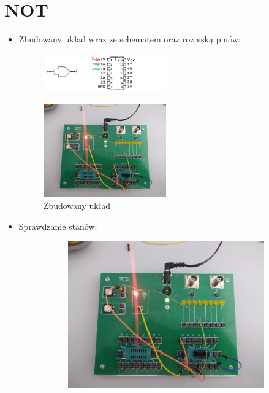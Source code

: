     \section{NOT}
        \begin{itemize}
            \item Zbudowany układ wraz ze schematem oraz rozpiską pinów:
                \begin{figure}[H]
                    \centering
                    \includegraphics[width=0.5\textwidth]{img/schemes_with_pins/NOR_not_w_pins.png}
                    \label{NOR:schemat_not_w_pins}
                \end{figure}
                \begin{figure}[H]
                    \centering
                    \includegraphics[width=0.5\textwidth]{img/NOR/funkcje/1652306732483_scaled.png}
                    \caption{Zbudowany układ}
                    \label{NOR:zbudowany_układ_NOT}
                \end{figure}
            \item Sprawdzanie stanów:
                \begin{figure}[H]
                    \centering
                        \begin{subfigure}[h]{0.4\textwidth}
                            \includegraphics[width=\textwidth]{img/NOR/funkcje/1652306732483_scaled.png}

\end{subfigure}
\end{figure}
\end{itemize}
